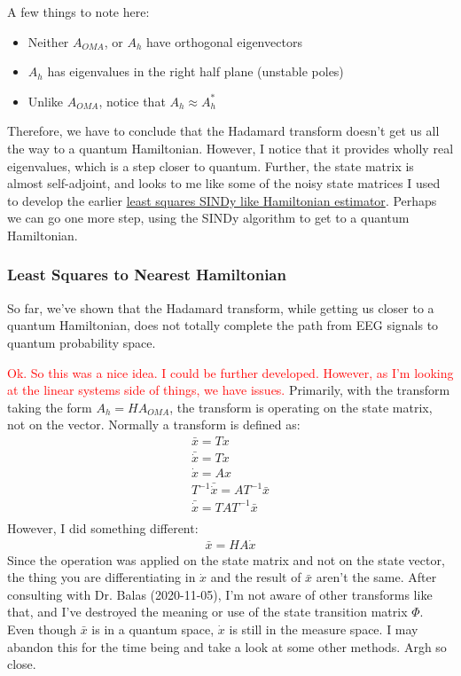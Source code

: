 A few things to note here:
\begin{itemize}
\item Neither $A_{OMA}$, or $A_h$ have orthogonal eigenvectors
\item $A_h$ has eigenvalues in the right half plane (unstable poles)
\item Unlike $A_{OMA}$, notice that $A_h\approx A_h^*$
\end{itemize}
Therefore, we have to conclude that the Hadamard transform doesn't get us all the way to a quantum Hamiltonian. However, I notice that it provides wholly real eigenvalues, which is a step closer to quantum. Further, the state matrix is almost self-adjoint, and looks to me like some of the noisy state matrices I used to develop the earlier \href{https://drive.google.com/file/d/17kZl22Yy5hwzDv9F1psR9IAmViYwAzik/view?usp=sharing}{least squares SINDy like Hamiltonian estimator}. Perhaps we can go one more step, using the SINDy algorithm to get to a quantum Hamiltonian. 
\subsubsection{Least Squares to Nearest Hamiltonian}
So far, we've shown that the Hadamard transform, while getting us closer to a quantum Hamiltonian, does not totally complete the path from EEG signals to quantum probability space. 

\textcolor{red}{Ok. So this was a nice idea. I could be further developed. However, as I'm looking at the linear systems side of things, we have issues.} Primarily, with the transform taking the form $A_{h}=HA_{OMA}$, the transform is operating on the state matrix, not on the vector. Normally a transform is defined as:
\begin{align}
\bar{x}=Tx\\
\bar{\dot{x}}=T\dot{x}\\
\dot{x}=Ax\\
T^{-1}\bar{\dot{x}}=AT^{-1}\bar{x}\\
\bar{\dot{x}}=TAT^{-1}\bar{x}\\
\end{align}
However, I did something different:
\begin{align}
\bar{x}=HA\dot{x}
\end{align}
Since the operation was applied on the state matrix and not on the state vector, the thing you are differentiating in $\dot{x}$ and the result of $\bar{x}$ aren't the same. After consulting with Dr. Balas (2020-11-05), I'm not aware of other transforms like that, and I've destroyed the meaning or use of the state transition matrix $\Phi$. Even though $\bar{x}$ is in a quantum space, $\dot{x}$ is still in the measure space. I may abandon this for the time being and take a look at some other methods. Argh so close. 

